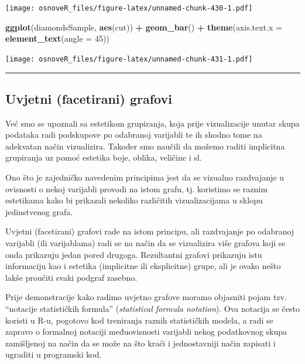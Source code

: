 \documentclass[]{book}
\newenvironment{Shaded}{\begin{snugshade}}{\end{snugshade}}
\newcommand{\KeywordTok}[1]{\textcolor[rgb]{0.13,0.29,0.53}{\textbf{#1}}}
\newcommand{\DataTypeTok}[1]{\textcolor[rgb]{0.13,0.29,0.53}{#1}}
\newcommand{\DecValTok}[1]{\textcolor[rgb]{0.00,0.00,0.81}{#1}}
\newcommand{\StringTok}[1]{\textcolor[rgb]{0.31,0.60,0.02}{#1}}
\newcommand{\OperatorTok}[1]{\textcolor[rgb]{0.81,0.36,0.00}{\textbf{#1}}}
\newcommand{\NormalTok}[1]{#1}
\theoremstyle{definition}
\theoremstyle{definition}
\theoremstyle{definition}
\theoremstyle{remark}
\begin{document}
\texttt{[image: osnoveR\_files/figure-latex/unnamed-chunk-430-1.pdf]}

\begin{Shaded}
\begin{Highlighting}[]
\KeywordTok{ggplot}\NormalTok{(diamondsSample, }\KeywordTok{aes}\NormalTok{(cut)) }\OperatorTok{+}\StringTok{ }\KeywordTok{geom_bar}\NormalTok{() }\OperatorTok{+}\StringTok{ }
\StringTok{  }\KeywordTok{theme}\NormalTok{(}\DataTypeTok{axis.text.x =} \KeywordTok{element_text}\NormalTok{(}\DataTypeTok{angle =} \DecValTok{45}\NormalTok{))}
\end{Highlighting}
\end{Shaded}

\texttt{[image: osnoveR\_files/figure-latex/unnamed-chunk-431-1.pdf]}

\begin{center}\rule{0.5\linewidth}{\linethickness}\end{center}

\subsection{Uvjetni (facetirani)
grafovi}\label{uvjetni-facetirani-grafovi}

Već smo se upoznali sa estetikom grupiranja, koja prije vizualizacije
unutar skupa podataka radi podskupove po odabranoj varijabli te ih
shodno tome na adekvatan način vizualizira. Također smo naučili da
možemo raditi implicitna grupiranja uz pomoć estetika boje, oblika,
veličine i sl.

Ono što je zajedničko navedenim principima jest da se vizualno
razdvajanje u ovisnosti o nekoj varijabli provodi na istom grafu, tj.
koristimo se raznim estetikama kako bi prikazali nekoliko različitih
vizualizacijama u sklopu jedinstvenog grafa.

Uvjetni (facetirani) grafovi rade na istom principu, ali razdvajanje po
odabranoj varijabli (ili varijablama) radi se na način da se vizualizira
više grafova koji se onda prikazuju jedan pored drugoga. Rezultantni
grafovi prikazuju istu informaciju kao i estetika (implicitne ili
eksplicitne) grupe, ali je ovako nešto lakše proučiti svaki podgraf
zasebno.

Prije demonstracije kako radimo uvjetno grafove moramo objasniti pojam
tzv. ``notacije statističkih formula'' (\emph{statistical formula
notation}). Ova notacija se često koristi u R-u, pogotovo kod treniranja
raznih statističkih modela, a radi se zapravo o formalnoj notaciji
međuovisnosti varijabli nekog podatkovnog skupa zamišljenoj na način da
se može na što kraći i jednostavniji način zapisati i ugraditi u
programski kod.
\end{document}
